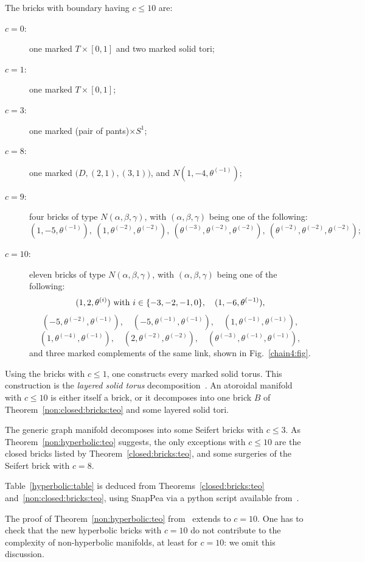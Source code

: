 \documentclass[10pt]{article}      %
\begin{document}
\begin{theorem} \label{non:closed:bricks:teo}
The bricks with boundary having $c\leqslant 10$ are:
\begin{description}
\item[$c=0$:] one marked $T\times [0,1]$ and two marked solid tori;
\item[$c=1$:] one marked $T\times [0,1]$;
\item[$c=3$:] one marked (pair of pants)$\times S^1$;
\item[$c=8$:] one marked $\big(D,(2,1),(3,1)\big)$, and $N(1,-4,\theta^{(-1)})$;
\item[$c=9$:] four bricks of type $N(\alpha, \beta, \gamma)$, 
with $(\alpha,\beta,\gamma)$ being one of the following:
$$(1,-5, \theta^{(-1)}), \ (1, \theta^{(-2)}, \theta^{(-2)}), \
(\theta^{(-3)}, \theta^{(-2)}, \theta^{(-2)}), \ (\theta^{(-2)}, \theta^{(-2)}, \theta^{(-2)});$$
\item[$c=10$:] eleven bricks of type $N(\alpha, \beta, \gamma)$, 
with $(\alpha,\beta,\gamma)$ being one of the following:
$$(1,2,\theta^{(i)})\ {\rm with}\ i\in\{-3,-2,-1,0\}, \quad 
(1,-6, \theta^{(-1)}), $$ 
$$(-5, \theta^{(-2)}, \theta^{(-1)}), \quad 
(-5, \theta^{(-1)}, \theta^{(-1)}), \quad
(1, \theta^{(-1)}, \theta^{(-1)}), $$
$$(1, \theta^{(-4)}, \theta^{(-1)}), \quad
(2, \theta^{(-2)}, \theta^{(-2)}), \quad
(\theta^{(-3)}, \theta^{(-1)}, \theta^{(-1)}),$$
and three marked complements of the same link, shown in Fig.~\ref{chain4:fig}.
\end{description}
\end{theorem}

\begin{remark}
Using the bricks with $c\leqslant 1$, one constructs every marked solid torus. This
construction is the \emph{layered solid torus} decomposition~\cite{Bu, JaRu}.
An atoroidal manifold with $c\leqslant 10$ is either itself a brick,
or it decomposes into one brick $B$ of Theorem~\ref{non:closed:bricks:teo}
and some layered solid tori. 
\end{remark}

\begin{remark}
The generic graph manifold decomposes into some Seifert bricks with $c\leqslant 3$.
As Theorem~\ref{non:hyperbolic:teo} suggests, the only exceptions with $c\leqslant 10$
are the closed bricks listed by Theorem~\ref{closed:bricks:teo}, and some surgeries of the 
Seifert brick with $c=8$. 
\end{remark}
\begin{remark}
Table~\ref{hyperbolic:table} is deduced from Theorems~\ref{closed:bricks:teo}
and~\ref{non:closed:bricks:teo}, using SnapPea via a python script available from~\cite{weblist}.
\end{remark}
\begin{remark}
The proof of Theorem~\ref{non:hyperbolic:teo} from~\cite{MaPe:geometric} extends to $c=10$.
One has to check that the new hyperbolic bricks with $c=10$ do not contribute to
the complexity of non-hyperbolic manifolds, at least for $c=10$: we omit this discussion.
\end{remark}
\end{document}
